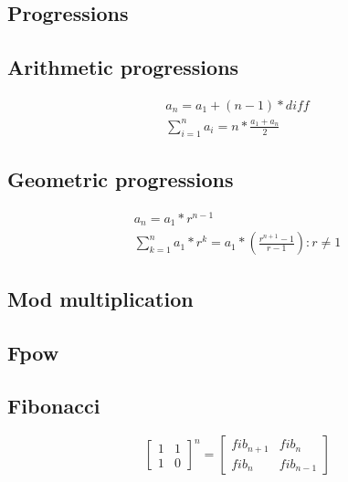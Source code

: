 
\subsection{Progressions}
\vspace{-10pt}
\subsection*{Arithmetic progressions}
\vspace{-10pt}
\begin{gather*}
a_n = a_1 + (n - 1) * diff \\
\sum_{i = 1}^n a_i = n * \frac{a_1 + a_n}{2} 
\end{gather*}
\vspace{-25pt}

\subsection*{Geometric progressions}
\vspace{-10pt}
\begin{gather*}
a_n = a_1 * r^{n - 1} \\
\sum_{k = 1}^{n} a_{1} * r^k = a_1 * \left( \frac{r^{n + 1} - 1}{r - 1} \right): r \neq 1
\end{gather*}
\vspace{-30pt}

\subsection{Mod multiplication}

\subsection{Fpow}

\subsection{Fibonacci}
\[
\begin{bmatrix}
    1  &  1      \\
    1  &  0      
\end{bmatrix}^{n}
= 
\begin{bmatrix}
    fib_{n+1}  &  fib_{n}      \\
    fib_{n}  &  fib_{n-1}      
\end{bmatrix} 
\]

